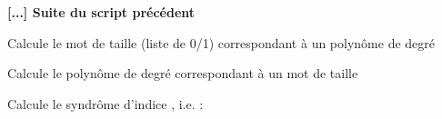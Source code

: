 \begin{maplegroup}
\begin{center}
\textbf{[...] Suite du script précédent}
\end{center}

\end{maplegroup}
\begin{maplegroup}
\begin{flushleft}
Calcule le mot de taille 
 (liste de 0/1) correspondant à un polynôme de degré 
\end{flushleft}

\end{maplegroup}
\begin{maplegroup}
\begin{mapleinput}
\end{mapleinput}

\end{maplegroup}
\begin{maplegroup}
\begin{flushleft}
Calcule le polynôme de degré 
 correspondant à un mot de taille 
\end{flushleft}

\end{maplegroup}
\begin{maplegroup}
\begin{mapleinput}
\end{mapleinput}

\end{maplegroup}
\begin{maplegroup}
\begin{flushleft}
Calcule le syndrôme d'indice 
, i.e. 
 :
\end{flushleft}

\end{maplegroup}
\begin{maplegroup}
\begin{mapleinput}
\end{mapleinput}

\end{maplegroup}
